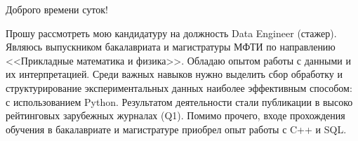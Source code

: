 

Доброго времени суток! 
\par
Прошу рассмотреть мою кандидатуру на должность  Data Engineer (стажер). Являюсь выпускником бакалавриата и магистратуры МФТИ по направлению <<Прикладные математика и физика>>. Обладаю опытом работы с данными и их интерпретацией. Среди важных навыков нужно выделить сбор обработку и структурирование экспериментальных данных наиболее эффективным способом: с использованием Python. Результатом деятельности стали  публикации в высоко рейтинговых зарубежных журналах (Q1). Помимо прочего, входе прохождения обучения в бакалавриате и магистратуре приобрел опыт работы с  C++ и SQL. 
